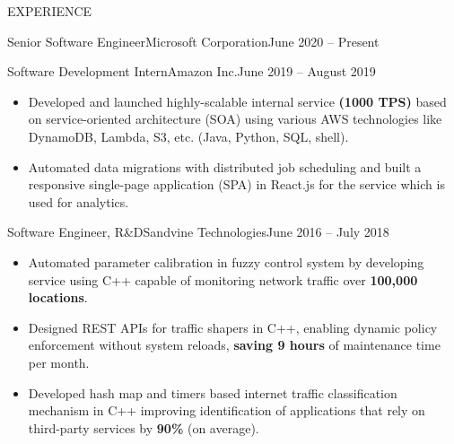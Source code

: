\documentclass[]{mcdowellcv}
\begin{document}
\begin{cvsection}{EXPERIENCE}
\begin{cvsubsection}{Senior Software Engineer}{Microsoft Corporation}{June 2020 -- Present}
		\end{cvsubsection}
		
	    \begin{cvsubsection}{Software Development Intern}{Amazon Inc.}{June 2019 -- August 2019}
			\begin{itemize}
				\item Developed and launched highly-scalable internal service \textbf{(1000 TPS)} based on service-oriented architecture (SOA) using various AWS technologies like DynamoDB, Lambda, S3, etc. (Java, Python, SQL, shell).
				\item Automated data migrations with distributed job scheduling and built a responsive single-page application (SPA) in React.js for the service which is used for analytics.
			\end{itemize}
		\end{cvsubsection}
		
		\begin{cvsubsection}{Software Engineer, R\&D}{Sandvine Technologies}{June 2016 -- July 2018}
			\begin{itemize}
				\item Automated parameter calibration in fuzzy control system by developing service using C++ capable of monitoring network traffic over \textbf{100,000 locations}.
				\item Designed REST APIs for traffic shapers in C++, enabling dynamic policy enforcement without system reloads, \textbf{saving 9 hours} of maintenance time per month.
				\item Developed hash map and timers based internet traffic classification mechanism in C++ improving identification of applications that rely on third-party services by \textbf{90\%} (on average).
			\end{itemize}
		\end{cvsubsection}
	\end{cvsection}
\end{document}
